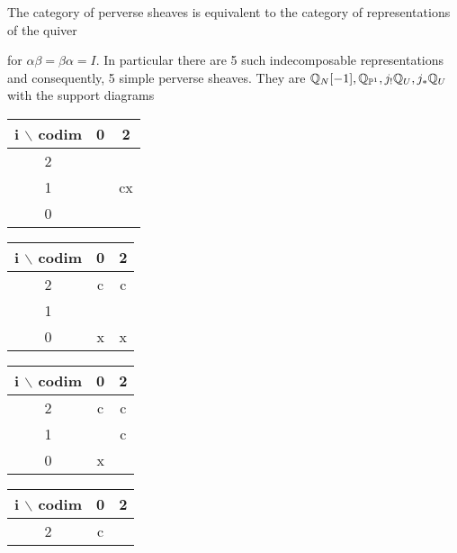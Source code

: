 \documentclass[12pt]{article}
\begin{document}
\begin{example}
    The category of perverse sheaves is equivalent to the category of representations 
    of the quiver \begin{center}
    \end{center} for $\alpha\beta = \beta\alpha = I$.
    In particular there are 5 such indecomposable representations and consequently,
    5 simple perverse sheaves. They are 
    $\mathbb{Q}_N[-1],\mathbb{Q}_{\mathbb{P}^1},j_!\mathbb{Q}_U, j_*\mathbb{Q}_U$ with the support diagrams
    \begin{center}
        \begin{tabular}{|c|c|c|}
            \hline
            i $\backslash$ codim & 0 & 2\\
            \hline
            2 &  &  \\
            \hline
            1 &  & cx \\
            \hline
            0 &  & \\
            \hline
        \end{tabular}
        \begin{tabular}{|c|c|c|}
            \hline
            i $\backslash$ codim & 0 & 2\\
            \hline
            2 & c & c \\
            \hline
            1 &  &  \\
            \hline
            0 & x & x\\
            \hline
        \end{tabular}
        \begin{tabular}{|c|c|c|}
            \hline
            i $\backslash$ codim & 0 & 2\\
            \hline
            2 &c  & c \\
            \hline
            1 &  &  c\\
            \hline
            0 & x & \\
            \hline
        \end{tabular}
        \begin{tabular}{|c|c|c|}
            \hline
            i $\backslash$ codim & 0 & 2\\
            \hline
            2 &  c&  \\

\end{tabular}
\end{center}
\end{example}
\end{document}
